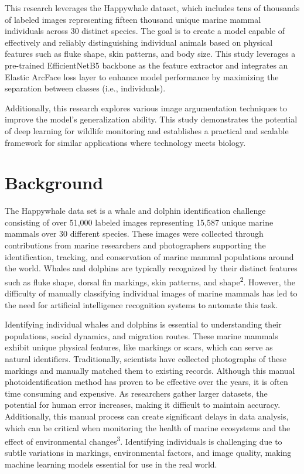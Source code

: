 \documentclass[twocolumn]{article}
\begin{document}
This research leverages the Happywhale dataset, which includes tens of thousands of labeled images representing fifteen thousand unique marine mammal individuals across 30 distinct species. The goal is to create a model capable of effectively and reliably distinguishing individual animals based on physical features such as fluke shape, skin patterns, and body size. This study leverages a pre-trained EfficientNetB5 backbone as the feature extractor and integrates an Elastic ArcFace loss layer to enhance model performance by maximizing the separation between classes (i.e., individuals).

Additionally, this research explores various image argumentation techniques to improve the model's generalization ability. This study demonstrates the potential of deep learning for wildlife monitoring and establishes a practical and scalable framework for similar applications where technology meets biology.

\section{Background}
The Happywhale data set is a whale and dolphin identification challenge consisting of over 51,000 labeled images representing 15,587 unique marine mammals over 30 different species. These images were collected through contributions from marine researchers and photographers supporting the identification, tracking, and conservation of marine mammal populations around the world. Whales and dolphins are typically recognized by their distinct features such as fluke shape, dorsal fin markings, skin patterns, and shape\textsuperscript{2}. However, the difficulty of manually classifying individual images of marine mammals has led to the need for artificial intelligence recognition systems to automate this task. 

Identifying individual whales and dolphins is essential to understanding their populations, social dynamics, and migration routes. These marine mammals exhibit unique physical features, like markings or scars, which can serve as natural identifiers. Traditionally, scientists have collected photographs of these markings and manually matched them to existing records. Although this manual photoidentification method has proven to be effective over the years, it is often time consuming and expensive. As researchers gather larger datasets, the potential for human error increases, making it difficult to maintain accuracy. Additionally, this manual process can create significant delays in data analysis, which can be critical when monitoring the health of marine ecosystems and the effect of environmental changes\textsuperscript{3}. Identifying individuals is challenging due to subtle variations in markings, environmental factors, and image quality, making machine learning models essential for use in the real world.
\end{document}
